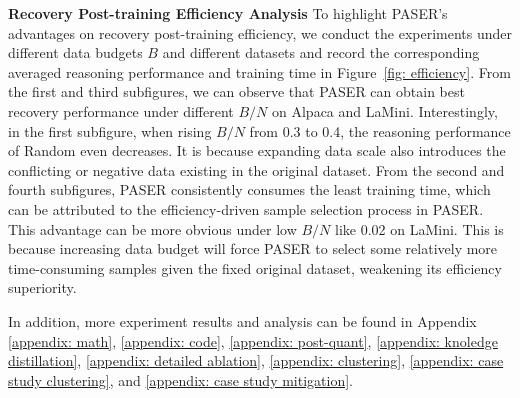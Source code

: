 \textbf{Recovery Post-training Efficiency Analysis}
To highlight PASER's advantages on recovery post-training efficiency, we conduct the experiments under different data budgets $B$ and different datasets and record the corresponding averaged reasoning performance and training time in Figure~\ref{fig: efficiency}. From the first and third subfigures, we can observe that PASER can obtain best recovery performance under different $B/N$ on Alpaca and LaMini. Interestingly, in the first subfigure, when rising $B/N$ from 0.3 to 0.4, the reasoning performance of Random even decreases. It is because expanding data scale also introduces the conflicting or negative data existing in the original dataset. From the second and fourth subfigures, PASER consistently consumes the least training time, which can be attributed to the efficiency-driven sample selection process in PASER. This advantage can be more obvious under low $B/N$ like 0.02 on LaMini. This is because increasing data budget will force PASER to select some relatively more time-consuming samples given the fixed original dataset, weakening its efficiency superiority.

In addition, more experiment results and analysis can be found in Appendix \ref{appendix: math}, \ref{appendix: code}, \ref{appendix: post-quant}, \ref{appendix: knoledge distillation}, \ref{appendix: detailed ablation}, \ref{appendix: clustering}, \ref{appendix: case study clustering}, and \ref{appendix: case study mitigation}.
\vspace{-2mm}
